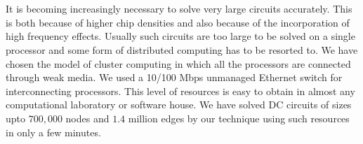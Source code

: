 \documentclass[10pt,psfig,letterpaper,twocolumn]{article}
\begin{document}
 
% 
%


\title{}
\author{
{}
}
\date{}
\maketitle
\thispagestyle{empty}
\begin{abstract}
Physical problems offer scope for macro level parallelization of solution by their essential structure. For parallelization of
electrical network simulation, the most natural structure based method is that of {\it Multiport Decomposition}. In this paper
this method is used for the simulation of electrical networks consisting of resistors, independent and controlled sources using 
a distributed cluster of weakly coupled processors. 
Results are presented for the cases where the number of processors
are 1,2,4,8 and for circuit sizes upto 700,000 nodes and
1.4 million edges. We use a cluster of Pentium IV processors linked 
through a 10/100MBPS ethernet switch.\\
\end{abstract}
\section*{}

It is becoming increasingly necessary to solve very large circuits
accurately. This is both because of higher chip densities and also
because of
the incorporation of high frequency effects.
Usually such circuits are too large to be solved on a single
processor and some form of distributed computing has to be resorted to.
We have chosen the model of cluster computing in which all the processors are connected 
through  weak media. 
We used a 10/100 Mbps unmanaged Ethernet switch for interconnecting processors. 
This level of resources is easy to obtain in almost any computational
laboratory or software house. We have solved DC circuits of sizes
upto $700,000$ nodes and $1.4$ million edges by our technique 
using such resources in only a few minutes.
\par
\end{document}
